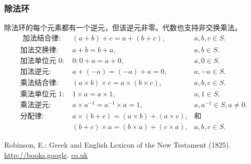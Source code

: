 \subsubsection*{除法环}
除法环的每个元素都有一个逆元，但该逆元非零。代数也支持非交换乘法。
$$
    \begin{array}{rlr}
        \text{ 加法结合律: } & (a+b)+c=a+(b+c), & a, b, c \in S .\\
        \text{加法交换律: } & a+b=b+a,          & a, b \in S .\\
        \text{加法单位元 0: } & 0: 0+a=a+0,       & a, 0 \in S .\\
        \text{加法逆元: }  &a+(-a)=(-a)+a=0,    & a, -a \in S .\\
        \text{乘法结合律: } &(a \times b) \times c=a \times(b \times c),& a, b, c \in S .\\
        \text{乘法单位元 1: } &1 \times a=a \times 1,& a, 1 \in S .\\
        \text{乘法逆元: } &a \times a^{-1}=a^{-1} \times a=1,& a,a^{-1}\in S ,a\neq 0.\\
        \text{分配律: } & a\times(b+c)=(a \times b)+(a \times c), &\text{和}\\
        &(b+c) \times a=(b \times a)+(c \times a), & a, b, c \in S .
\end{array}
$$

\begin{thebibliography}{99}
     Robinson, E.: Greek and English Lexicon of the New Testament (1825). \href{http://books.google}{http://books.google}. \href{http://co.uk}{co.uk}
\end{thebibliography}